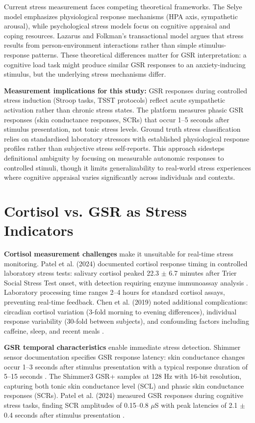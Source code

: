 Current stress measurement faces competing theoretical frameworks. The Selye model emphasizes physiological response mechanisms (HPA axis, sympathetic arousal), while psychological stress models focus on cognitive appraisal and coping resources. Lazarus and Folkman's transactional model argues that stress results from person-environment interactions rather than simple stimulus-response patterns. These theoretical differences matter for GSR interpretation: a cognitive load task might produce similar GSR responses to an anxiety-inducing stimulus, but the underlying stress mechanisms differ.

\textbf{Measurement implications for this study:} GSR responses during controlled stress induction (Stroop tasks, TSST protocols) reflect acute sympathetic activation rather than chronic stress states. The platform measures phasic GSR responses (skin conductance responses, SCRs) that occur 1--5 seconds after stimulus presentation, not tonic stress levels. Ground truth stress classification relies on standardised laboratory stressors with established physiological response profiles rather than subjective stress self-reports. This approach sidesteps definitional ambiguity by focusing on measurable autonomic responses to controlled stimuli, though it limits generalizability to real-world stress experiences where cognitive appraisal varies significantly across individuals and contexts.

\section{Cortisol vs. GSR as Stress Indicators}
\textbf{Cortisol measurement challenges} make it unsuitable for real-time stress monitoring. Patel et al. (2024) documented cortisol response timing in controlled laboratory stress tests: salivary cortisol peaked 22.3 $\pm$ 6.7 minutes after Trier Social Stress Test onset, with detection requiring enzyme immunoassay analysis \cite{ref7}. Laboratory processing time ranges 2--4 hours for standard cortisol assays, preventing real-time feedback. Chen et al. (2019) noted additional complications: circadian cortisol variation (3-fold morning to evening differences), individual response variability (30-fold between subjects), and confounding factors including caffeine, sleep, and recent meals \cite{ref4}.

\textbf{GSR temporal characteristics} enable immediate stress detection. Shimmer sensor documentation specifies GSR response latency: skin conductance changes occur 1--3 seconds after stimulus presentation with a typical response duration of 5--15 seconds \cite{ref8}. The Shimmer3 GSR+ samples at 128 Hz with 16-bit resolution, capturing both tonic skin conductance level (SCL) and phasic skin conductance responses (SCRs). Patel et al. (2024) measured GSR responses during cognitive stress tasks, finding SCR amplitudes of 0.15--0.8 $\mu$S with peak latencies of 2.1 $\pm$ 0.4 seconds after stimulus presentation \cite{ref7}.

